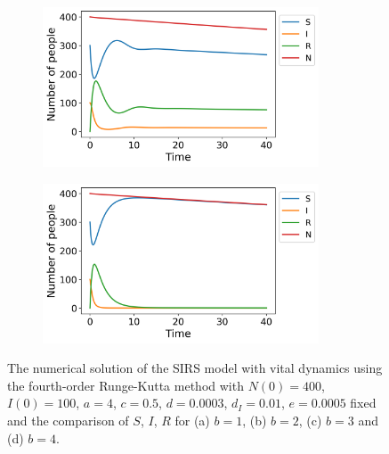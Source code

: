 \documentclass[../main.tex]{subfiles}
\begin{document}
\begin{figure}[htb!]
    \begin{subfigure}[b]{0.475\textwidth}
    \centering
    \includegraphics[width=0.9\textwidth]{../figures/SIRS_vital_rk4_b=3.png}
    \caption{}
    \label{fig:vital_b=3}
    \end{subfigure}
    \quad
    \begin{subfigure}[b]{0.475\textwidth}
    \includegraphics[width=0.9\textwidth]{../figures/SIRS_vital_rk4_b=4.png}
    \caption{}
    \label{fig:vital_b=4}
    \end{subfigure}
    \caption{The numerical solution of the SIRS model with vital dynamics using the fourth-order Runge-Kutta method with $N(0)=400$, $I(0)=100$, $a=4$, $c=0.5$, $d=0.0003$, $d_I=0.01$, $e=0.0005$ fixed and the comparison of $S$, $I$, $R$ for (a)  $b=1$, (b) $b=2$, (c) $b=3$ and (d) $b=4$.}
    \label{fig:SIRS_rk4_vital}
\end{figure}
\end{document}
